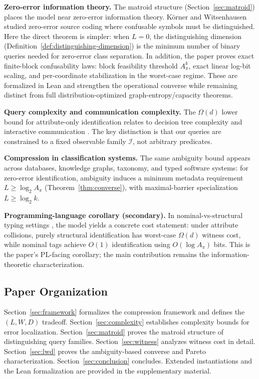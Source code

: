 \textbf{Zero-error information theory.} The matroid structure (Section~\ref{sec:matroid}) places the model near zero-error information theory. K\"orner \cite{korner1973coding} and Witsenhausen \cite{witsenhausen1976zero} studied zero-error source coding where confusable symbols must be distinguished. Here the direct theorem is simpler: when $L = 0$, the distinguishing dimension (Definition~\ref{def:distinguishing-dimension}) is the minimum number of binary queries needed for zero-error class separation. In addition, the paper proves exact finite-block confusability laws: block feasibility threshold $A_\pi^k$, exact linear log-bit scaling, and per-coordinate stabilization in the worst-case regime. These are formalized in Lean and strengthen the operational converse while remaining distinct from full distribution-optimized graph-entropy/capacity theorems.

\textbf{Query complexity and communication complexity.} The $\Omega(d)$ lower bound for attribute-only identification relates to decision tree complexity \cite{buhrman2002complexity} and interactive communication \cite{orlitsky1991worst}. The key distinction is that our queries are constrained to a fixed observable family $\mathcal{I}$, not arbitrary predicates.

\textbf{Compression in classification systems.} The same ambiguity bound appears across databases, knowledge graphs, taxonomy, and typed software systems: for zero-error identification, ambiguity induces a minimum metadata requirement $L \ge \log_2 A_\pi$ (Theorem~\ref{thm:converse}), with maximal-barrier specialization $L \ge \log_2 k$.

\textbf{Programming-language corollary (secondary).} In nominal-vs-structural typing settings \cite{Cardelli1985, cook1990inheritance}, the model yields a concrete cost statement: under attribute collisions, purely structural identification has worst-case $\Omega(d)$ witness cost, while nominal tags achieve $O(1)$ identification using $O(\log A_\pi)$ bits. This is the paper's PL-facing corollary; the main contribution remains the information-theoretic characterization.

\subsection{Paper Organization}

Section~\ref{sec:framework} formalizes the compression framework and defines the $(L, W, D)$ tradeoff. Section~\ref{sec:complexity} establishes complexity bounds for error localization. Section~\ref{sec:matroid} proves the matroid structure of distinguishing query families. Section~\ref{sec:witness} analyzes witness cost in detail. Section~\ref{sec:lwd} proves the ambiguity-based converse and Pareto characterization. Section~\ref{sec:conclusion} concludes. Extended instantiations and the Lean formalization are provided in the supplementary material.
